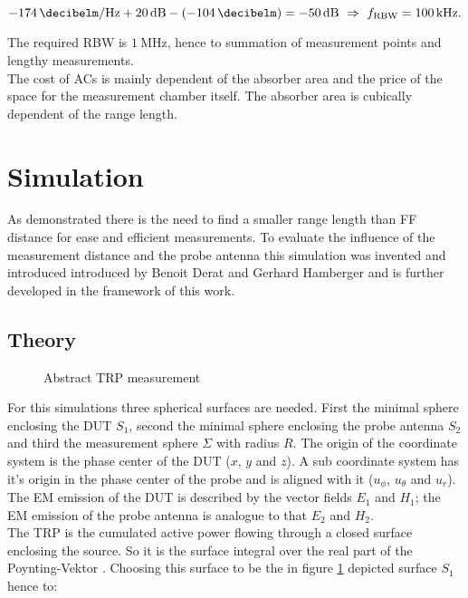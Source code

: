 \begin{equation}
\SI{-174}{\decibelm\per\hertz}+\SI{20}{\decibel}-\left(\SI{-104}{\decibelm}\right)=\SI{-50}{\decibel}\ \Rightarrow\ f_{\text{RBW}}=\SI{100}{\kilo\hertz}.
\end{equation}

The required \ac{RBW} is $\SI{1}{\mega\hertz}$, hence to summation of measurement points and lengthy measurements.\\
The cost of \acp{AC} is mainly dependent of the absorber area and the price of the space for the measurement chamber itself. The absorber area is cubically dependent of the range length.
\section{Simulation}

As demonstrated there is the need to find a smaller range length than \ac{FF} distance for ease and efficient measurements. To evaluate the influence of the measurement distance and the probe antenna this simulation was invented and introduced introduced by Benoit Derat and Gerhard Hamberger \cite{mypaper} and is further developed in the framework of this work.

\subsection{Theory}

\begin{figure}[h]
\centering
\def\svgwidth{0.5\textwidth}

\caption{Abstract TRP measurement}
\label{fig:trpmeas}
\end{figure}

For this simulations three spherical surfaces are needed. First the minimal sphere enclosing the \ac{DUT} $S_1$, second the minimal sphere enclosing the probe antenna $S_2$ and third the measurement sphere $\Sigma$ with radius $R$. The origin of the coordinate system is the phase center of the \ac{DUT} ($x$, $y$ and $z$). A sub coordinate system has it's origin in the phase center of the probe and is aligned with it ($u_\phi$, $u_\theta$ and $u_r$). The \ac{EM} emission of the \ac{DUT} is described by the vector fields $E_1$ and $H_1$; the \ac{EM} emission of the probe antenna is analogue to that $E_2$ and $H_2$.\\
The \ac{TRP} is the cumulated active power flowing through a closed surface enclosing the source. So it is the surface integral over the real part of the Poynting-Vektor \cite{mypaper}. Choosing this surface to be the in figure \ref{fig:trpmeas} depicted surface $S_1$ hence to:

